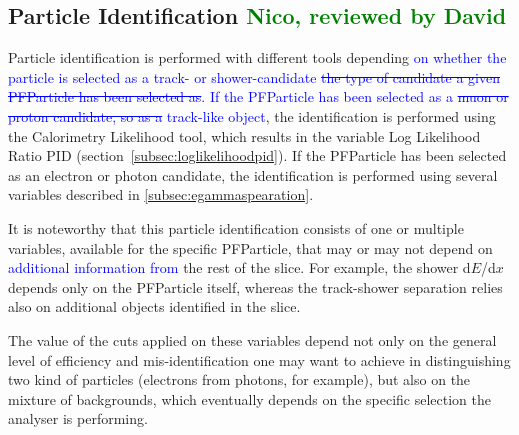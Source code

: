 \documentclass[a4paper]{article}
\begin{document}
\subsection{Particle Identification \textcolor{green}{Nico, reviewed by David}}
Particle identification is performed with different tools depending \textcolor{blue}{on whether the particle is selected as a track- or shower-candidate \st{the type of candidate a given PFParticle has been selected as}.
If the PFParticle has been selected as a \st{muon or proton candidate, so as a} track-like object}, the identification is performed using the Calorimetry Likelihood tool, which results in the variable Log Likelihood Ratio PID  (section~\ref{subsec:loglikelihoodpid}).
If the PFParticle has been selected as an electron or photon candidate, the identification is performed using several variables described in \ref{subsec:egammaspearation}.

It is noteworthy that this particle identification consists of one or multiple variables, available for the specific PFParticle, that may or may not depend on \textcolor{blue}{additional information from} the rest of the slice. 
For example, the shower d$E$/d$x$ depends only on the PFParticle itself, whereas the track-shower separation relies also on additional objects identified in the slice.

The value of the cuts applied on these variables depend not only on the general level of efficiency and mis-identification one may want to achieve in distinguishing two kind of particles (electrons from photons, for example), but also on the mixture of backgrounds, which eventually depends on the specific selection the analyser is performing.
\end{document}
